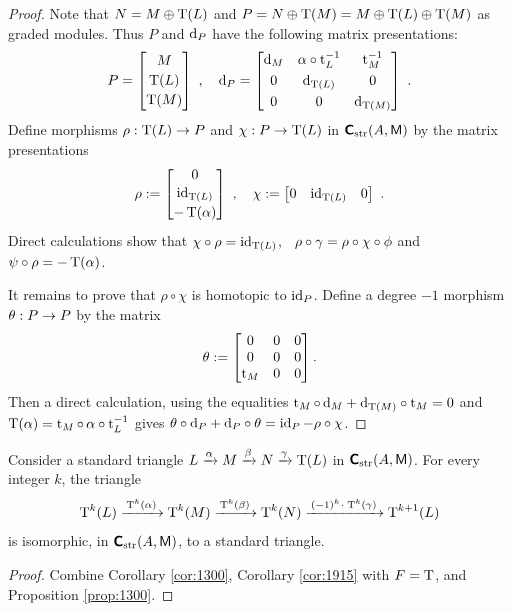 \begin{proof}
Note that 
$N = M \oplus \operatorname{T}(L)$ and
$P = N \oplus \operatorname{T}(M) = M \oplus \operatorname{T}(L) \oplus \operatorname{T}(M)$
as graded modules. Thus $P$ and $\mathrm{d}_P$ have the following matrix presentations:
\[ P = \begin{bmatrix}  M \\[0.2em] \operatorname{T}(L) \\[0.2em] \operatorname{T}(M)  \end{bmatrix} \ , \quad
\mathrm{d}_P =  \begin{bmatrix}  \mathrm{d}_M & \alpha \circ \operatorname{t}_L^{-1} & \operatorname{t}_M^{-1} 
\\[0.3em] 0 & \mathrm{d}_{\operatorname{T}(L)} & 0 
\\[0.3em] 0 &  0 & \mathrm{d}_{\operatorname{T}(M)}  \end{bmatrix} \ . \]
Define morphisms $\rho: \operatorname{T}(L) \to P$ and $\chi : P \to \operatorname{T}(L)$ in 
$\boldsymbol{\mathsf{C}}_{\mathrm{str}}(A, \operatorname{\mathsf{M}})$ by the matrix presentations
\[ \rho := \begin{bmatrix}  0 \\[0.1em] \operatorname{id}_{\operatorname{T}(L)}  
\\[0.2em] - \operatorname{T}(\alpha)  \end{bmatrix} \  , \quad
\chi := \begin{bmatrix}  0 & \operatorname{id}_{\operatorname{T}(L)} & 0  \end{bmatrix} \ .  \]
Direct calculations show that
$\chi \circ \rho = \operatorname{id}_{\operatorname{T}(L)}$, \,
$\rho \circ \gamma = \rho \circ \chi \circ \phi$ and 
$\psi \circ \rho = \lb - \opn{T}(\al)$.

It remains to prove that $\rho \circ \chi$ is homotopic to $\operatorname{id}_P$. 
Define a degree $-1$ morphism $\theta : P \to P$ by the matrix
\[ \theta := \begin{bmatrix}  0 & 0 & 0 \\[0em] 0 & 0 & 0 
\\[0em] \operatorname{t}_{M} & 0 & 0 \end{bmatrix} . \]
Then a direct calculation, using the equalities 
$\operatorname{t}_{M} \circ \, \mathrm{d}_M + \mathrm{d}_{\operatorname{T}(M)} \circ \operatorname{t}_{M} = 0$
and 
$\operatorname{T}(\alpha) =  \operatorname{t}_{M} \circ \, \alpha \circ \operatorname{t}_{L}^{-1}$
gives 
$\theta \circ \mathrm{d}_P + \mathrm{d}_P \circ \theta = \operatorname{id}_P - \rho  \circ \chi$.
\end{proof}

\begin{lem} \label{lem:1265} 
Consider a  standard triangle 
$L \xrightarrow{\alpha} M \xrightarrow{\beta} N \xrightarrow{\gamma} \operatorname{T}(L)$
in $\boldsymbol{\mathsf{C}}_{\mathrm{str}}(A, \operatorname{\mathsf{M}})$.
For every integer $k$, the triangle 
\[ \operatorname{T}^k(L) \xrightarrow{ \, \operatorname{T}^k(\alpha) \, } \operatorname{T}^k(M) 
\xrightarrow{ \, \operatorname{T}^k(\beta) \, } \operatorname{T}^k(N) 
\xrightarrow{ \, (-1)^k \mspace{1.5mu}{\cdot}\mspace{1.5mu} \operatorname{T}^k(\gamma) \, } 
\operatorname{T}^{k + 1}(L)  \]
is isomorphic, in $\boldsymbol{\mathsf{C}}_{\mathrm{str}}(A, \operatorname{\mathsf{M}})$, to a standard triangle.
\end{lem}

\begin{proof}
Combine Corollary \ref{cor:1300}, Corollary \ref{cor:1915} with $F = \operatorname{T}$,  
and Proposition \ref{prop:1300}.
\end{proof}

